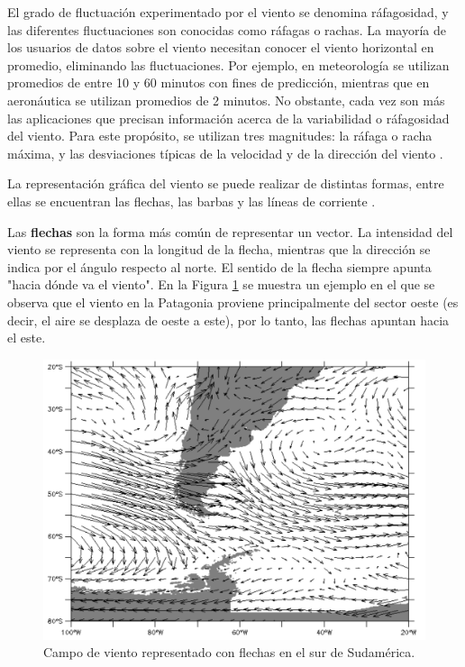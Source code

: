 El grado de fluctuación experimentado por el viento se denomina  ráfagosidad, y las diferentes fluctuaciones son conocidas como ráfagas o rachas. La mayoría de los usuarios de datos sobre el viento necesitan conocer el viento horizontal en promedio, eliminando las fluctuaciones. Por ejemplo, en meteorología se utilizan promedios de entre 10 y 60 minutos con fines de predicción, mientras que en aeronáutica se utilizan promedios de 2 minutos. No obstante, cada vez son más las aplicaciones que precisan información acerca de la variabilidad o ráfagosidad del viento. Para este propósito, se utilizan tres magnitudes: la ráfaga o racha máxima, y las desviaciones típicas de la velocidad y de la dirección del viento \cite{wmoChapter8}.

La representación gráfica del viento se puede realizar de distintas formas, entre ellas se encuentran las flechas, las barbas y las líneas de corriente .

Las \textbf{flechas} \cite{CursoDeObsevadores} son la forma más común de representar un vector. La intensidad del viento se representa con la longitud de la flecha, mientras que la dirección se indica por el ángulo respecto al norte. El sentido de la flecha siempre apunta "hacia dónde va el viento". En la Figura \ref{fig:mapaFlechas} se muestra un ejemplo en el que se observa que el viento en la Patagonia proviene principalmente del sector oeste (es decir, el aire se desplaza de oeste a este), por lo tanto, las flechas apuntan hacia el este.

\begin{figure}[H]
    \centering
    \includegraphics[width=0.85\linewidth]{Figuras/viento/mapaFlechas.png}
    \caption{Campo de viento representado con flechas en el sur de Sudamérica. \cite{cursoObservadores2024}}
    \label{fig:mapaFlechas}
\end{figure}

